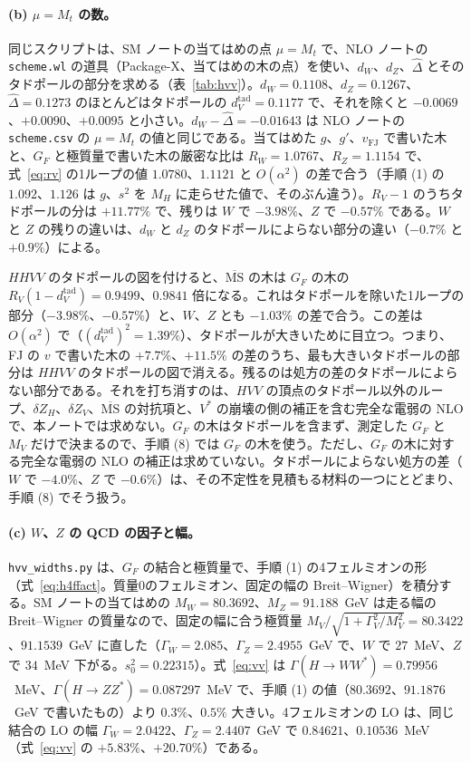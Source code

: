 \documentclass[a4paper,10pt]{ltjsarticle}
\newcommand{\MSbar}{\overline{\mathrm{MS}}}
\begin{document}
\paragraph{(b) $\mu=M_t$ の数。}同じスクリプトは、SM ノートの当てはめの点 $\mu=M_t$ で、NLO ノートの \texttt{scheme.wl} の道具（Package-X、当てはめの木の点）を使い、$d_W$、$d_Z$、$\hat\Delta$ とそのタドポールの部分を求める（表~\ref{tab:hvv}）。$d_W=0.1108$、$d_Z=0.1267$、$\hat\Delta=0.1273$ のほとんどはタドポールの $d_V^{\mathrm{tad}}=0.1177$ で、それを除くと $-0.0069$、$+0.0090$、$+0.0095$ と小さい。$d_W-\hat\Delta=-0.01643$ は NLO ノートの \texttt{scheme.csv} の $\mu=M_t$ の値と同じである。当てはめた $g$、$g'$、$v_{\mathrm{FJ}}$ で書いた木と、$G_F$ と極質量で書いた木の厳密な比は $R_W=1.0767$、$R_Z=1.1154$ で、式~\eqref{eq:rv} の1ループの値 $1.0780$、$1.1121$ と $O(\alpha^2)$ の差で合う（手順 (1) の $1.092$、$1.126$ は $g$、$s^2$ を $M_H$ に走らせた値で、そのぶん違う）。$R_V-1$ のうちタドポールの分は $+11.77\%$ で、残りは $W$ で $-3.98\%$、$Z$ で $-0.57\%$ である。$W$ と $Z$ の残りの違いは、$d_W$ と $d_Z$ のタドポールによらない部分の違い（$-0.7\%$ と $+0.9\%$）による。

$HHVV$ のタドポールの図を付けると、$\MSbar$ の木は $G_F$ の木の $R_V(1-d_V^{\mathrm{tad}})=0.9499$、$0.9841$ 倍になる。これはタドポールを除いた1ループの部分（$-3.98\%$、$-0.57\%$）と、$W$、$Z$ とも $-1.03\%$ の差で合う。この差は $O(\alpha^2)$ で（$(d_V^{\mathrm{tad}})^2=1.39\%$）、タドポールが大きいために目立つ。つまり、FJ の $v$ で書いた木の $+7.7\%$、$+11.5\%$ の差のうち、最も大きいタドポールの部分は $HHVV$ のタドポールの図で消える。残るのは処方の差のタドポールによらない部分である。それを打ち消すのは、$HVV$ の頂点のタドポール以外のループ、$\delta Z_H$、$\delta Z_V$、$\MSbar$ の対抗項と、$V^*$ の崩壊の側の補正を含む完全な電弱の NLO で、本ノートでは求めない。$G_F$ の木はタドポールを含まず、測定した $G_F$ と $M_V$ だけで決まるので、手順 (8) では $G_F$ の木を使う。ただし、$G_F$ の木に対する完全な電弱の NLO の補正は求めていない。タドポールによらない処方の差（$W$ で $-4.0\%$、$Z$ で $-0.6\%$）は、その不定性を見積もる材料の一つにとどまり、手順 (8) でそう扱う。

\paragraph{(c) $W$、$Z$ の QCD の因子と幅。}\texttt{hvv\_widths.py} は、$G_F$ の結合と極質量で、手順 (1) の4フェルミオンの形（式~\eqref{eq:h4ffact}。質量0のフェルミオン、固定の幅の Breit--Wigner）を積分する。SM ノートの当てはめの $M_W=80.3692$、$M_Z=91.188$~GeV は走る幅の Breit--Wigner の質量なので、固定の幅に合う極質量 $M_V/\sqrt{1+\Gamma_V^2/M_V^2}=80.3422$、$91.1539$~GeV に直した（$\Gamma_W=2.085$、$\Gamma_Z=2.4955$~GeV で、$W$ で $27$~MeV、$Z$ で $34$~MeV 下がる。$s_0^2=0.22315$）。式~\eqref{eq:vv} は $\Gamma(H\to WW^*)=0.79956$~MeV、$\Gamma(H\to ZZ^*)=0.087297$~MeV で、手順 (1) の値（$80.3692$、$91.1876$~GeV で書いたもの）より $0.3\%$、$0.5\%$ 大きい。4フェルミオンの LO は、同じ結合の LO の幅 $\Gamma_W=2.0422$、$\Gamma_Z=2.4407$~GeV で $0.84621$、$0.10536$~MeV（式~\eqref{eq:vv} の $+5.83\%$、$+20.70\%$）である。
\end{document}
